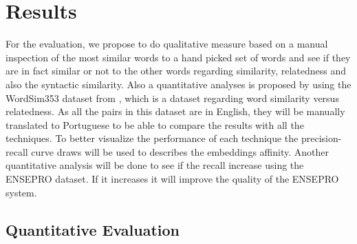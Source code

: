 \section{Results}\label{chap:results}




For the evaluation, we propose to do qualitative measure based on a manual inspection of the most similar words to a hand picked set of words and see if they are in fact similar or not to the other words regarding similarity, relatedness and also the syntactic similarity.
Also a quantitative analyses is proposed by using the WordSim353 dataset from , which is a dataset regarding word similarity versus relatedness. As all the pairs in this dataset are in English, they will be manually translated to Portuguese to be able to compare the results with all the techniques.
To better visualize the performance of each technique the precision-recall curve draws will be used to describes the embeddings affinity.
Another quantitative analysis will be done to see if the recall increase using the ENSEPRO dataset. If it increases it will improve the quality of the ENSEPRO system. 




\subsection{Quantitative Evaluation}\label{chap:results:quantitative}





